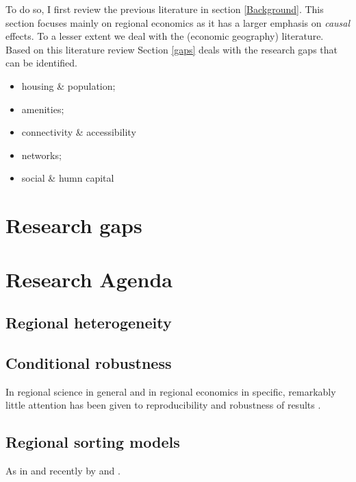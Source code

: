 \documentclass[fleqn,10pt]{SelfArx} %
\begin{document}
To do so, I first review the previous literature in section \ref{Background}. This section focuses mainly on regional economics as it has a larger emphasis on \textit{causal} effects. To a lesser extent we deal with the (economic geography) literature. Based on this literature review Section \ref{gaps} deals with the research gaps that can be identified.


\begin{itemize}
	\item housing \& population; 
	\item amenities;
	\item connectivity \& accessibility
	\item networks;
	\item social \& humn capital
\end{itemize}


\section{Research gaps\label{gaps}}


\section{Research Agenda}


\subsection{Regional heterogeneity}

\citep{Thissen2016, Graaff2012, DeGraaff2012}

\subsection{Conditional robustness}

In regional science in general and in regional economics in specific, remarkably little attention has been given to reproducibility and robustness of results \citep[with some exceptions as, amongst some others, by][]{Rey:2014cl,arribas2015woow, Arribas2016}.

\subsection{Regional sorting models}

As in \citet{Bayer2004, Bayer2007a} and recently by \citet{Wang2016} and \citet{Bernasco2016}.



\printbibliography

\end{document}
